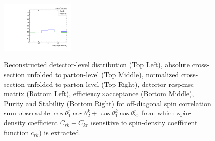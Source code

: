 \begin{figure}[htb]
\begin{center}
 \includegraphics[width=0.32\textwidth]{fig_fullRun2UL/unfolding/combined/PurStab_c_Prk.pdf} \\
\caption{Reconstructed detector-level distribution (Top Left), absolute cross-section unfolded to parton-level (Top Middle), normalized cross-section unfolded to parton-level (Top Right), detector response-matrix (Bottom Left), efficiency$\times$acceptance (Bottom Middle), Purity and Stability (Bottom Right) for off-diagonal spin correlation sum observable $\cos\theta_{1}^{r}\cos\theta_{2}^{k}+\cos\theta_{1}^{k}\cos\theta_{2}^{r}$, from which spin-density coefficient $C_{rk}+C_{kr}$ (sensitive to spin-density coefficient function $c_{r k}$) is extracted.}
\label{fig:c_Prk}
\end{center}
\end{figure}
\clearpage

